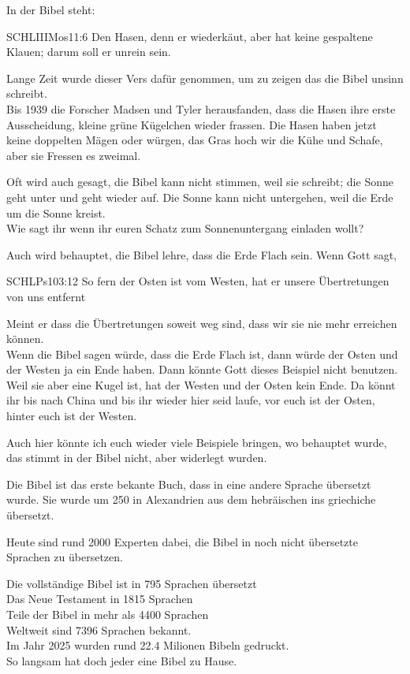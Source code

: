 \documentclass[fontsize=16pt]{mybib}
\begin{document}
\begin{otsblock}
    In der Bibel steht:
    \begin{bibelbox}{SCHL}{IIIMos}{11:6}
        Den Hasen, denn er wiederkäut, aber hat keine gespaltene Klauen; darum soll er unrein sein.
    \end{bibelbox}
    Lange Zeit wurde dieser Vers dafür genommen, um zu zeigen das die Bibel unsinn schreibt.\\
    Bis 1939 die Forscher Madsen und Tyler herausfanden, dass die Hasen ihre erste Ausscheidung, kleine grüne Kügelchen wieder frassen. Die Hasen haben jetzt keine doppelten Mägen oder würgen, das Gras hoch wir die Kühe und Schafe, aber sie Fressen es zweimal.

    Oft wird auch gesagt, die Bibel kann nicht stimmen, weil sie schreibt; die Sonne geht unter und geht wieder auf. Die Sonne kann nicht untergehen, weil die Erde um die Sonne kreist.\\
    Wie sagt ihr wenn ihr euren Schatz zum Sonnenuntergang einladen wollt? 

    Auch wird behauptet, die Bibel lehre, dass die Erde Flach sein. Wenn Gott sagt, 
    \begin{bibelbox}{SCHL}{Ps}{103:12}
    So fern der Osten ist vom Westen, hat er unsere Übertretungen von uns entfernt
    \end{bibelbox}
    Meint er dass die Übertretungen soweit weg sind, dass wir sie nie mehr erreichen können.\\
    Wenn die Bibel sagen würde, dass die Erde Flach ist, dann würde der Osten und der Westen ja ein Ende haben. Dann könnte Gott dieses Beispiel nicht benutzen.\\
    Weil sie aber eine Kugel ist, hat der Westen und der Osten kein Ende. Da könnt ihr bis nach China und bis ihr wieder hier seid laufe, vor euch ist der Osten, hinter euch ist der Westen.

    Auch hier könnte ich euch wieder viele Beispiele bringen, wo behauptet wurde, das stimmt in der Bibel nicht, aber widerlegt wurden.
\end{otsblock}
\begin{otsblock}
    Die Bibel ist das erste bekante Buch, dass in eine andere Sprache übersetzt wurde. Sie wurde um 250 \vChr{} in Alexandrien aus dem hebräischen ins griechiche übersetzt.

    Heute sind rund 2000 Experten dabei, die Bibel in noch nicht übersetzte Sprachen zu übersetzen.

    Die vollständige Bibel ist in 795 Sprachen übersetzt\\
    Das Neue Testament in 1815 Sprachen\\
    Teile der Bibel in mehr als 4400 Sprachen\\
    Weltweit sind 7396 Sprachen bekannt.\\
    Im Jahr 2025 wurden rund 22.4 Milionen Bibeln gedruckt.\\
    So langsam hat doch jeder eine Bibel zu Hause. 
\end{otsblock}
\end{document}
